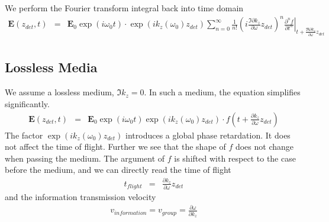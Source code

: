 \documentclass[12pt,a4paper,twoside,openright,BCOR10mm,headsepline,titlepage,abstracton,chapterprefix,final]{scrreprt}
\newcommand\Vector[1]{{\mathbf{#1}}}
\newcommand\wavenumber{k}
\newcommand\scalarEfield{E}
\newcommand\Efield{\Vector{\scalarEfield}}
\begin{document}
We perform the Fourier transform integral back into time domain
\begin{eqnarray}
\Efield(z_{det}, t) &=& 
  \Efield_0 \exp ( i \omega_0 t)
  \cdot
     \exp (i \wavenumber_z(\omega_0) z_{det})
     \sum_{n=0}^{\infty}
          \frac{1}{n!}
          \left(i \frac{\Im \partial \wavenumber_z}{\partial \omega} z_{det}\right)^n 
     \left. 
       \frac{\partial^n f}{\partial t^n}
     \right|_{t + \frac{\Re \partial \wavenumber_z}{\partial \omega} z_{det}}
  \nonumber\\
\end{eqnarray}


\subsection{Lossless Media}
We assume a lossless medium, $\Im \wavenumber_z = 0$.
In such a medium, the equation simplifies significantly.
\begin{eqnarray}
\Efield(z_{det}, t)
 &=&
 \Efield_0 \exp ( i \omega_0 t) \exp (i \wavenumber_z(\omega_0) z_{det}) 
 \cdot f\left(t + \frac{ \partial \wavenumber_z}{\partial \omega} z_{det}\right)
\end{eqnarray}
The factor $\exp (i \wavenumber_z(\omega_0) z_{det})$ introduces 
a global phase retardation. It does not affect the time of flight.
Further we see that the shape of $f$ does not change when passing the medium.
The argument of $f$ is shifted with respect to the case before the medium, and
we can directly read the time of flight
\begin{eqnarray}
 t_{flight} &=& \frac{ \partial \wavenumber_z}{\partial \omega} z_{det}
\end{eqnarray}
and the information transmission velocity
\begin{eqnarray}
 v_{information} = v_{group} = \frac{\partial \omega}{\partial \wavenumber_z}
\end{eqnarray}
\end{document}
